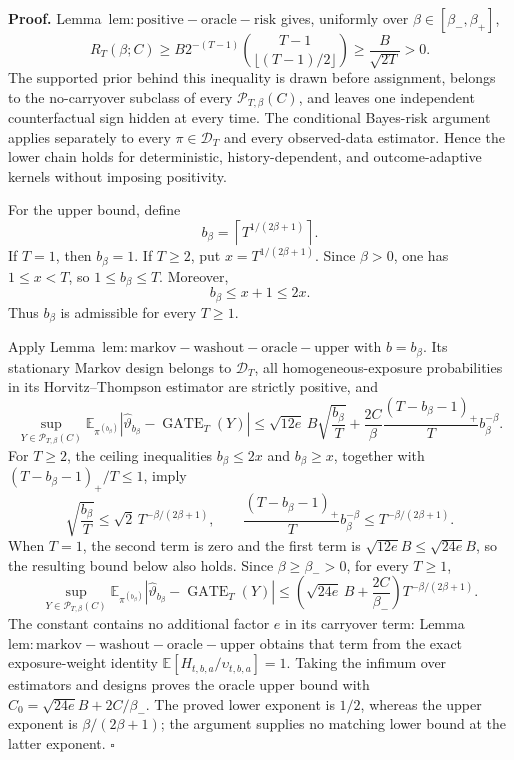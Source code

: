 \textbf{Proof.} Lemma~\(\mathrm{lem:positive-oracle-risk}\) gives, uniformly over \(\beta\in[\beta_-,\beta_+]\),
\[
R_T(\beta;C)
\ge B2^{-(T-1)}\binom{T-1}{\lfloor(T-1)/2\rfloor}
\ge \frac{B}{\sqrt{2T}}>0.
\]
The supported prior behind this inequality is drawn before assignment, belongs to the no-carryover subclass of every \(\mathcal P_{T,\beta}(C)\), and leaves one independent counterfactual sign hidden at every time. The conditional Bayes-risk argument applies separately to every \(\pi\in\mathcal D_T\) and every observed-data estimator. Hence the lower chain holds for deterministic, history-dependent, and outcome-adaptive kernels without imposing positivity.

For the upper bound, define
\[
b_\beta=\left\lceil T^{1/(2\beta+1)}\right\rceil.
\]
If \(T=1\), then \(b_\beta=1\). If \(T\ge2\), put \(x=T^{1/(2\beta+1)}\). Since \(\beta>0\), one has \(1\le x<T\), so \(1\le b_\beta\le T\). Moreover,
\[
b_\beta\le x+1\le2x.
\]
Thus \(b_\beta\) is admissible for every \(T\ge1\).

Apply Lemma~\(\mathrm{lem:markov-washout-oracle-upper}\) with \(b=b_\beta\). Its stationary Markov design belongs to \(\mathcal D_T\), all homogeneous-exposure probabilities in its Horvitz--Thompson estimator are strictly positive, and
\[
\sup_{Y\in\mathcal P_{T,\beta}(C)}
\mathbb E_{\pi^{(b_\beta)}}
\left|\widehat\vartheta_{b_\beta}-\operatorname{GATE}_T(Y)\right|
\le
\sqrt{12e}\,B\sqrt{\frac{b_\beta}{T}}
+\frac{2C}{\beta}\frac{(T-b_\beta-1)_+}{T}b_\beta^{-\beta}.
\]
For \(T\ge2\), the ceiling inequalities \(b_\beta\le2x\) and \(b_\beta\ge x\), together with \((T-b_\beta-1)_+/T\le1\), imply
\[
\sqrt{\frac{b_\beta}{T}}
\le \sqrt2\,T^{-\beta/(2\beta+1)},
\qquad
\frac{(T-b_\beta-1)_+}{T}b_\beta^{-\beta}
\le T^{-\beta/(2\beta+1)}.
\]
When \(T=1\), the second term is zero and the first term is \(\sqrt{12e}B\le\sqrt{24e}B\), so the resulting bound below also holds. Since \(\beta\ge\beta_->0\), for every \(T\ge1\),
\[
\sup_{Y\in\mathcal P_{T,\beta}(C)}
\mathbb E_{\pi^{(b_\beta)}}
\left|\widehat\vartheta_{b_\beta}-\operatorname{GATE}_T(Y)\right|
\le
\left(\sqrt{24e}\,B+\frac{2C}{\beta_-}\right)
T^{-\beta/(2\beta+1)}.
\]
The constant contains no additional factor \(e\) in its carryover term: Lemma~\(\mathrm{lem:markov-washout-oracle-upper}\) obtains that term from the exact exposure-weight identity \(\mathbb E[H_{t,b,a}/\upsilon_{t,b,a}]=1\). Taking the infimum over estimators and designs proves the oracle upper bound with \(C_0=\sqrt{24e}B+2C/\beta_-\). The proved lower exponent is \(1/2\), whereas the upper exponent is \(\beta/(2\beta+1)\); the argument supplies no matching lower bound at the latter exponent. \(\square\)